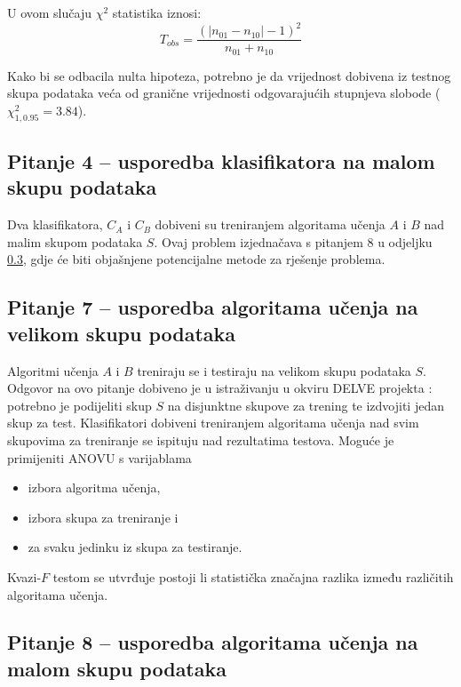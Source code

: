 U ovom slučaju $\chi^2$ statistika iznosi:
\begin{equation}
T_{obs} = \frac{(|n_{01} - n_{10}|-1)^2}{n_{01}+n_{10}}
\end{equation}

Kako bi se odbacila nulta hipoteza, potrebno je da vrijednost dobivena iz testnog skupa podataka veća od granične vrijednosti odgovarajućih stupnjeva slobode ($\chi^{2}_{1,0.95} = 3.84$).

\subsection{Pitanje 4 -- usporedba klasifikatora na malom skupu podataka}

Dva klasifikatora, $C_A$ i $C_B$ dobiveni su treniranjem algoritama učenja $A$ i $B$ nad malim skupom podataka $S$. Ovaj problem \citep{dietterich1998approximate} izjednačava s pitanjem 8 u odjeljku \ref{subsec:pitanje8}, gdje će biti objašnjene potencijalne metode za rješenje problema. 

\subsection{Pitanje 7 -- usporedba algoritama učenja na velikom skupu podataka}

Algoritmi učenja $A$ i $B$ treniraju se i testiraju na velikom skupu podataka $S$. Odgovor na ovo pitanje dobiveno je u istraživanju u okviru DELVE projekta \citep{hintondelve}: potrebno je podijeliti skup $S$ na disjunktne skupove za trening te izdvojiti jedan skup za test. Klasifikatori dobiveni treniranjem algoritama učenja nad svim skupovima za treniranje se ispituju nad rezultatima testova. Moguće je primijeniti ANOVU s varijablama \begin{itemize}
\item izbora algoritma učenja,
\item izbora skupa za treniranje i 
\item za svaku jedinku iz skupa za testiranje.
\end{itemize}
Kvazi-$F$ testom \citep{eisen1966225} se utvrđuje postoji li statistička značajna razlika između različitih algoritama učenja.

\subsection{Pitanje 8 -- usporedba algoritama učenja na malom skupu podataka}
\label{subsec:pitanje8}

